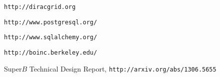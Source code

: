 \documentclass[a4paper]{jpconf}
\begin{document}
\begin{thebibliography}{30}




\verb"http://diracgrid.org"

\verb"http://www.postgresql.org/"

\verb"http://www.sqlalchemy.org/"

\verb"http://boinc.berkeley.edu/"

Super$B$ Technical Design Report, \verb"http://arxiv.org/abs/1306.5655"













\end{thebibliography}
\end{document}
